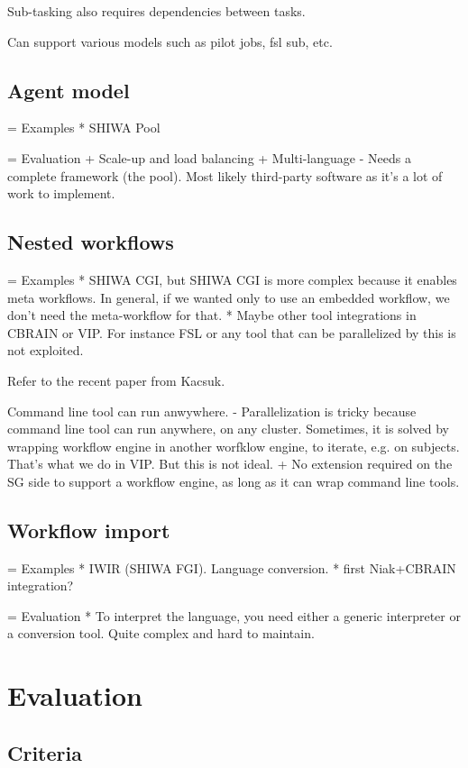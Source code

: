 \documentclass[11pt]{article}
\begin{document}
Sub-tasking also requires dependencies between tasks.

Can support various models such as pilot jobs, fsl sub, etc.

\subsection{Agent model}

= Examples
* SHIWA Pool

= Evaluation
+ Scale-up and load balancing
+ Multi-language
- Needs a complete framework (the pool). Most likely third-party software as it's a lot of work to implement.

\subsection{Nested workflows}

=  Examples
* SHIWA CGI, but SHIWA CGI is more complex because it enables meta workflows. In general, if we wanted only to use an embedded workflow, we don't need the meta-workflow for that. 
* Maybe other tool integrations in CBRAIN or VIP. For instance FSL or any tool that can be parallelized by this is not exploited.

Refer to the recent paper from Kacsuk. 

Command line tool can run anwywhere.
- Parallelization is tricky because command line tool can run anywhere, on any cluster. Sometimes, it is solved by wrapping workflow engine in another worfklow engine, to iterate, e.g. on subjects. That's what we do in VIP. But this is not ideal.
+ No extension required on the SG side to support a workflow engine, as long as it can wrap command line tools.

\subsection{Workflow import}

= Examples
* IWIR (SHIWA FGI). Language conversion.
* first Niak+CBRAIN integration?

= Evaluation
* To interpret the language, you need either a generic interpreter or a conversion tool. Quite complex and hard to  maintain.

\section{Evaluation}

\subsection{Criteria}
\end{document}
